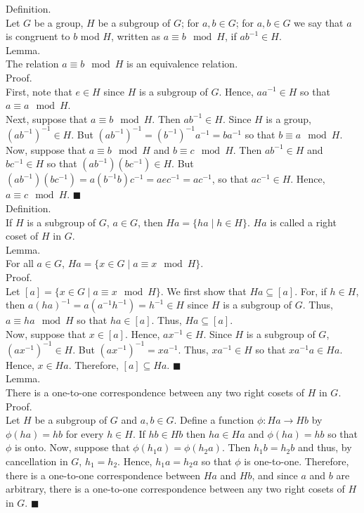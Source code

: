 \documentclass[twocolumn]{article}
\newcommand{\qed}{$\blacksquare$}
\begin{document}
Definition. \\
Let $G$ be a group, $H$ be a subgroup of $G$; for $a, b \in G$; for $a, b \in G$ we say that $a$ is congruent to $b$ mod $H$, written as $a \equiv b \mod H$, if $ab^{-1} \in H$. \\

Lemma. \\
The relation $a \equiv b \mod H$ is an equivalence relation. \\
Proof. \\
First, note that $e \in H$ since $H$ is a subgroup of $G$. Hence, $aa^{-1} \in H$ so that $a \equiv a \mod  H$. \\
Next, suppose that $a \equiv b \mod H$. Then $ab^{-1} \in H$. Since $H$ is a group, $(ab^{-1})^{-1} \in H$. But $(ab^{-1})^{-1} = (b^{-1})^{-1}a^{-1} = ba^{-1}$ so that $b \equiv a \mod H$. \\
Now, suppose that $a \equiv b \mod H$ and $b \equiv c \mod H$. Then $ab^{-1} \in H$ and $bc^{-1} \in H$ so that $(ab^{-1})(bc^{-1}) \in H$. But $(ab^{-1})(bc^{-1}) = a(b^{-1}b)c^{-1} = aec^{-1} = ac^{-1}$,  so that $ac^{-1} \in H$. Hence, $a \equiv c \mod H$. \qed \\

Definition. \\
If $H$ is a subgroup of $G$, $a \in G$, then $Ha = \{ ha \mid h \in H \}$. $Ha$ is called a right coset of $H$ in $G$. \\

Lemma. \\
For all $a \in G$, $Ha = \{ x \in G \mid a \equiv x \mod H \}$. \\
Proof. \\
Let $[a] = \{ x \in G \mid a \equiv x \mod H \}$. We first show that $Ha \subseteq [a]$. For, if $h \in H$, then $a(ha)^{-1} = a(a^{-1}h^{-1}) = h^{-1} \in H$ since $H$ is a subgroup of $G$. Thus, $a \equiv ha \mod H$ so that $ha \in [a]$. Thus, $Ha \subseteq [a]$. \\
Now, suppose that $x \in [a]$. Hence, $ax^{-1} \in H$. Since $H$ is a subgroup of $G$, $(ax^{-1})^{-1} \in H$. But $(ax^{-1})^{-1} = xa^{-1}$. Thus, $xa^{-1} \in H$ so that $xa^{-1}a \in Ha$. Hence, $x \in Ha$. Therefore, $[a] \subseteq Ha$. \qed \\

Lemma. \\
There is a one-to-one correspondence between any two right cosets of $H$ in $G$. \\
Proof. \\
Let $H$ be a subgroup of $G$ and $a, b \in G$. Define a function $\phi : Ha \rightarrow Hb$ by $\phi(ha) = hb$ for every $h \in H$. If $hb \in Hb$ then $ha \in Ha$ and $\phi(ha) = hb$ so that $\phi$ is onto. Now, suppose that $\phi(h_1a) = \phi(h_2a)$. Then $h_1b = h_2b$ and thus, by cancellation in $G$, $h_1 = h_2$. Hence, $h_1a = h_2a$ so that $\phi$ is one-to-one. Therefore, there is a one-to-one correspondence between $Ha$ and $Hb$, and since $a$ and $b$ are arbitrary, there is a one-to-one correspondence between any two right cosets of $H$ in $G$. \qed \\
\end{document}
